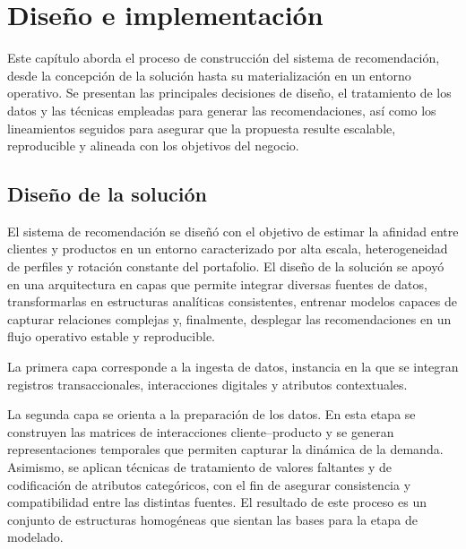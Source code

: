 \chapter{Diseño e implementación} %

\label{Chapter3} %

Este capítulo aborda el proceso de construcción del sistema de recomendación, desde la concepción de la solución hasta su materialización en un entorno operativo. Se presentan las principales decisiones de diseño, el tratamiento de los datos y las técnicas empleadas para generar las recomendaciones, así como los lineamientos seguidos para asegurar que la propuesta resulte escalable, reproducible y alineada con los objetivos del negocio.


\section{Diseño de la solución}

El sistema de recomendación se diseñó con el objetivo de estimar la afinidad entre clientes y productos en un entorno caracterizado por alta escala, heterogeneidad de perfiles y rotación constante del portafolio. El diseño de la solución se apoyó en una arquitectura en capas que permite integrar diversas fuentes de datos, transformarlas en estructuras analíticas consistentes, entrenar modelos capaces de capturar relaciones complejas y, finalmente, desplegar las recomendaciones en un flujo operativo estable y reproducible.

La primera capa corresponde a la ingesta de datos, instancia en la que se integran registros transaccionales, interacciones digitales y atributos contextuales. 

La segunda capa se orienta a la preparación de los datos. En esta etapa se construyen las matrices de interacciones cliente–producto y se generan representaciones temporales que permiten capturar la dinámica de la demanda. Asimismo, se aplican técnicas de tratamiento de valores faltantes y de codificación de atributos categóricos, con el fin de asegurar consistencia y compatibilidad entre las distintas fuentes. El resultado de este proceso es un conjunto de estructuras homogéneas que sientan las bases para la etapa de modelado.

